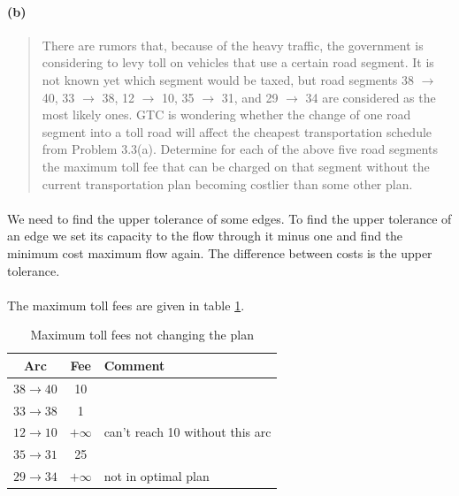 \paragraph{(b)}
\begin{quote}
There are rumors that, because of the heavy traffic, the government is considering to levy toll on vehicles that use a certain road segment. It is not known yet which segment would be taxed, but road segments 38 $\rightarrow$ 40, 33 $\rightarrow$ 38, 12 $\rightarrow$ 10, 35 $\rightarrow$ 31, and 29 $\rightarrow$ 34 are considered as the most likely ones.
GTC is wondering whether the change of one road segment into a toll road will affect the cheapest transportation schedule from Problem 3.3(a). Determine for each of the above five road segments the maximum toll fee that can be charged on that segment without the current transportation plan becoming costlier than some other plan.
\end{quote}

\paragraph{}
We need to find the upper tolerance of some edges. To find the upper tolerance of an edge we set its capacity to the flow through it minus one and find the minimum cost maximum flow again. The difference between costs is the upper tolerance.

\paragraph{}
The maximum toll fees are given in table \ref{toll-fees}.

\begin{table}[H]
\centering
\begin{tabular}{|c|c|l|}
\hline
Arc & Fee & Comment \\ \hline
$ 38 \rightarrow 40 $ & 10 & \\ \hline
$ 33 \rightarrow 38 $ & 1 & \\ \hline
$ 12 \rightarrow 10 $ & $+\infty$ & can't reach 10 without this arc \\ \hline
$ 35 \rightarrow 31 $ & 25 & \\ \hline
$ 29 \rightarrow 34 $ & $+\infty$ & not in optimal plan \\ \hline
\end{tabular}
\caption{Maximum toll fees not changing the plan}
\label{toll-fees}
\end{table}

